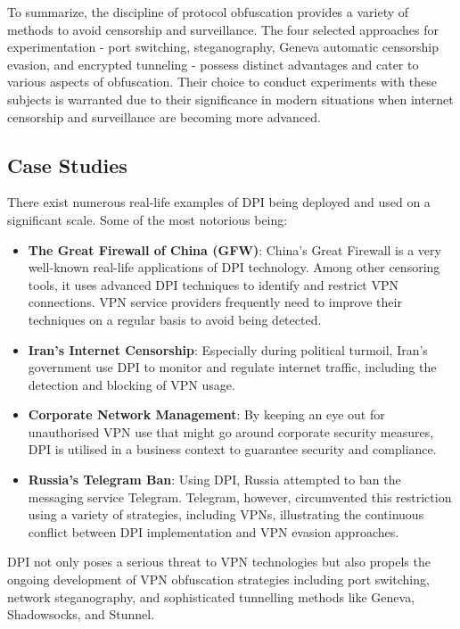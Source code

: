 \documentclass[12pt, fleqn, a4paper]{article}
\begin{document}
To summarize, the discipline of protocol obfuscation provides a variety of methods to avoid censorship and surveillance. The four selected approaches for experimentation - port switching, steganography, Geneva automatic censorship evasion, and encrypted tunneling - possess distinct advantages and cater to various aspects of obfuscation. Their choice to conduct experiments with these subjects is warranted due to their significance in modern situations when internet censorship and surveillance are becoming more advanced. 

\subsection{Case Studies}
There exist numerous real-life examples of DPI being deployed and used on a significant scale. Some of the most notorious being:
\begin{itemize}
  \item \textbf{The Great Firewall of China (GFW)}: China's Great Firewall is a very well-known real-life applications of DPI technology. Among other censoring tools, it uses advanced DPI techniques to identify and restrict VPN connections. VPN service providers frequently need to improve their techniques on a regular basis to avoid being detected. \citep{gfw}
  \item \textbf{Iran's Internet Censorship}: Especially during political turmoil, Iran's government use DPI to monitor and regulate internet traffic, including the detection and blocking of VPN usage. \citep{iran}
  \item \textbf{Corporate Network Management}: By keeping an eye out for unauthorised VPN use that might go around corporate security measures, DPI is utilised in a business context to guarantee security and compliance.
  \item \textbf{Russia's Telegram Ban}: Using DPI, Russia attempted to ban the messaging service Telegram. Telegram, however, circumvented this restriction using a variety of strategies, including VPNs, illustrating the continuous conflict between DPI implementation and VPN evasion approaches. \citep{russia}
\end{itemize}

DPI not only poses a serious threat to VPN technologies but also propels the ongoing development of VPN obfuscation strategies including port switching, network steganography, and sophisticated tunnelling methods like Geneva, Shadowsocks, and Stunnel.
\end{document}
